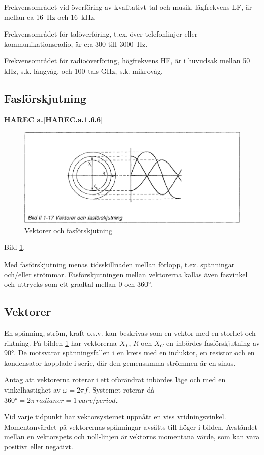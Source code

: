 Frekvensområdet vid överföring av kvalitativt tal och musik, lågfrekvens LF, är
mellan ca 16~Hz och 16~kHz.

Frekvensområdet för talöverföring, t.ex. över telefonlinjer eller
kommunikationsradio, är c:a 300 till 3000~Hz.

Frekvensområdet för radioöverföring, högfrekvens HF, är i huvudsak mellan
50 kHz, s.k. långvåg, och 100-tals GHz, s.k. mikrovåg.

\subsection{Fasförskjutning}
\textbf{HAREC a.\ref{HAREC.a.1.6.6}\label{myHAREC.a.1.6.6}}

\begin{figure}[h]
\includegraphics[width=\textwidth]{images/bild_2_1-17}
\caption{Vektorer och fasförskjutning}
\label{fig:BildII1-17}
\end{figure}

Bild \ref{fig:BildII1-17}.

Med fasförskjutning menas tidsskillnaden mellan förlopp, t.ex. spänningar
och/eller strömmar. Fasförskjutningen mellan vektorerna kallas även fasvinkel
och uttrycks som ett gradtal mellan 0 och 360°.

\subsection{Vektorer}

En spänning, ström, kraft o.s.v. kan beskrivas som en vektor med en storhet och
riktning. På bilden \ref{fig:BildII1-17} har vektorerna \(X_L\), \(R\)
och \(X_C\) en inbördes fasförskjutning av 90°. De motsvarar spänningsfallen i
en krets med en induktor, en resistor och en kondensator kopplade i serie,
där den gemensamma strömmen är en sinus.

Antag att vektorerna roterar i ett oförändrat inbördes läge och med en
vinkelhastighet av \(\omega= 2\pi f\). Systemet roterar då
\(360° = 2\pi\ radianer = 1\ varv/period\).

Vid varje tidpunkt har vektorsystemet uppnått en viss vridningsvinkel.
Momentanvärdet på vektorernas spänningar avsätts till höger i bilden. Avståndet
mellan en vektorspets och noll-linjen är vektorns momentana värde, som kan vara
positivt eller negativt.

